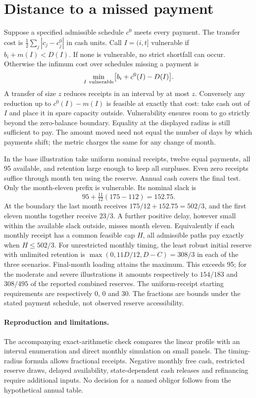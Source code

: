 \documentclass[11pt]{article}
\begin{document}
\section{Distance to a missed payment}
Suppose a specified admissible schedule $c^0$ meets every payment. The transfer cost is $\tfrac12\sum_j|c_j-c^0_j|$ in cash units. Call $I=(i,t]$ vulnerable if $b_i+m(I)<D(I)$. If none is vulnerable, no strict shortfall can occur. Otherwise the infimum cost over schedules missing a payment is
\[
 \min_{I\ {\rm vulnerable}} \bigl[b_i+c^0(I)-D(I)\bigr].
\]
A transfer of size $z$ reduces receipts in an interval by at most $z$. Conversely any reduction up to $c^0(I)-m(I)$ is feasible at exactly that cost: take cash out of $I$ and place it in spare capacity outside. Vulnerability ensures room to go strictly beyond the zero-balance boundary. Equality at the displayed radius is still sufficient to pay. The amount moved need not equal the number of days by which payments shift; the metric charges the same for any change of month.

In the base illustration take uniform nominal receipts, twelve equal payments, all 95 available, and retention large enough to keep all surpluses. Even zero receipts suffice through month ten using the reserve. Annual cash covers the final test. Only the month-eleven prefix is vulnerable. Its nominal slack is
\[
 95+\tfrac{11}{12}(175-112)=152.75.
\]
At the boundary the last month receives $175/12+152.75=502/3$, and the first eleven months together receive $23/3$. A further positive delay, however small within the available slack outside, misses month eleven. Equivalently if each monthly receipt has a common feasible cap $H$, all admissible paths pay exactly when $H\le502/3$. For unrestricted monthly timing, the least robust initial reserve with unlimited retention is $\max(0,11D/12,D-C)=308/3$ in each of the three scenarios. Final-month loading attains the maximum. This exceeds 95; for the moderate and severe illustrations it amounts respectively to $154/183$ and $308/495$ of the reported combined reserves. The uniform-receipt starting requirements are respectively 0, 0 and 30. The fractions are bounds under the stated payment schedule, not observed reserve accessibility.

\paragraph{Reproduction and limitations.} The accompanying exact-arithmetic check compares the linear profile with an interval enumeration and direct monthly simulation on small panels. The timing-radius formula allows fractional receipts. Negative monthly free cash, restricted reserve draws, delayed availability, state-dependent cash releases and refinancing require additional inputs. No decision for a named obligor follows from the hypothetical annual table.
\end{document}

